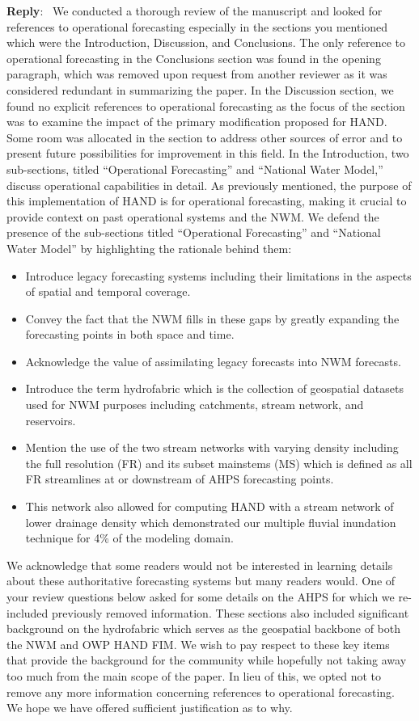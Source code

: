\documentclass[11pt]{article}
\newcounter{reviewer}
\newcounter{point}[reviewer]
\newenvironment{reply}
   {\medskip \noindent \begin{sf}\textbf{Reply}:\  }
   {\medskip \end{sf}}
\begin{document}
\begin{reply}
We conducted a thorough review of the manuscript and looked for references to operational forecasting especially in the sections you mentioned which were the Introduction, Discussion, and Conclusions.
The only reference to operational forecasting in the Conclusions section was found in the opening paragraph, which was removed upon request from another reviewer as it was considered redundant in summarizing the paper.
In the Discussion section, we found no explicit references to operational forecasting as the focus of the section was to examine the impact of the primary modification proposed for HAND.
Some room was allocated in the section to address other sources of error and to present future possibilities for improvement in this field.
In the Introduction, two sub-sections, titled ``Operational Forecasting'' and ``National Water Model,''  discuss operational capabilities in detail.  
As previously mentioned, the purpose of this implementation of HAND is for operational forecasting, making it crucial to provide context on past operational systems and the NWM.
We defend the presence of the sub-sections titled ``Operational Forecasting'' and ``National Water Model'' by highlighting the rationale behind them:
\begin{itemize}
\item Introduce legacy forecasting systems including their limitations in the aspects of spatial and temporal coverage.
\item Convey the fact that the NWM fills in these gaps by greatly expanding the forecasting points in both space and time.
\item Acknowledge the value of assimilating legacy forecasts into NWM forecasts.
\item Introduce the term hydrofabric which is the collection of geospatial datasets used for NWM purposes including catchments, stream network, and reservoirs.
\item Mention the use of the two stream networks with varying density including the full resolution (FR) and its subset mainstems (MS) which is defined as all FR streamlines at or downstream of AHPS forecasting points.
\item This network also allowed for computing HAND with a stream network of lower drainage density which demonstrated our multiple fluvial inundation technique for 4\% of the modeling domain.
\end{itemize}   
We acknowledge that some readers would not be interested in learning details about these authoritative forecasting systems but many readers would.
One of your review questions below asked for some details on the AHPS for which we re-included previously removed information.
These sections also included significant background on the hydrofabric which serves as the geospatial backbone of both the NWM and OWP HAND FIM.
We wish to pay respect to these key items that provide the background for the community while hopefully not taking away too much from the main scope of the paper.
In lieu of this, we opted not to remove any more information concerning references to operational forecasting.
We hope we have offered sufficient justification as to why.
\end{reply}
\end{document}
